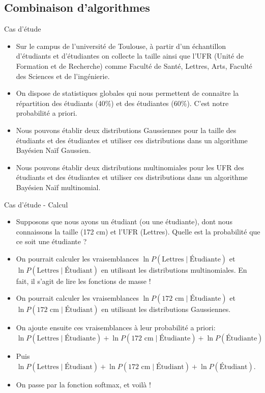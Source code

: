 \subsection[Combinaison d'algorithmes]{Combinaison d'algorithmes}

\begin{frame}{Cas d'étude}
	\begin{itemize}
		\item Sur le campus de l'université de Toulouse, à partir d'un échantillon d'étudiants et d'étudiantes on collecte la taille ainsi que l'UFR (Unité de Formation et de Recherche) comme Faculté de Santé, Lettres, Arts, Faculté des Sciences et de l'ingénierie.
		\pause
		\item On dispose de statistiques globales qui nous permettent de connaitre la répartition des étudiants (40\%) et des étudiantes (60\%). C'est notre probabilité a priori.
		\pause
		\item Nous pouvons établir deux distributions Gaussiennes pour la taille des étudiants et des étudiantes et utiliser ces distributions dans un algorithme Bayésien Naïf Gaussien.
		\pause
		\item Nous pouvons établir deux distributions multinomiales pour les UFR des étudiants et des étudiantes et utiliser ces distributions dans un algorithme Bayésien Naïf multinomial.
	\end{itemize}
\end{frame}

\begin{frame}{Cas d'étude - Calcul}
	\begin{itemize}
		\item Supposons que nous ayons un étudiant (ou une étudiante), dont nous connaissons la taille (172 cm) et l'UFR (Lettres). Quelle est la probabilité que ce soit une étudiante ?
		\pause
		\item On pourrait calculer les vraisemblances $\ln P(\text{Lettres} \mid \text{\'Etudiante})$ et $\ln P(\text{Lettres} \mid \text{\'Etudiant})$ en utilisant les distributions multinomiales. En fait, il s'agit de lire les fonctions de masse !
		\pause
		\item On pourrait calculer les vraisemblances $\ln P(\text{172 cm} \mid \text{\'Etudiante})$ et $\ln P(\text{172 cm} \mid \text{\'Etudiant})$ en utilisant les distributions Gaussiennes.
		\pause
		\item On ajoute ensuite ces vraisemblances à leur probabilité a priori: $\ln P(\text{Lettres} \mid \text{\'Etudiante}) + \ln P(\text{172 cm} \mid \text{\'Etudiante}) + \ln P(\text{\'Etudiante})$
		\pause
		\item Puis $\ln P(\text{Lettres} \mid \text{\'Etudiant}) + \ln P(\text{172 cm} \mid \text{\'Etudiant}) + \ln P(\text{\'Etudiant})$. 
		\pause
		\item On passe par la fonction softmax, et voilà !
	\end{itemize}
\end{frame}

